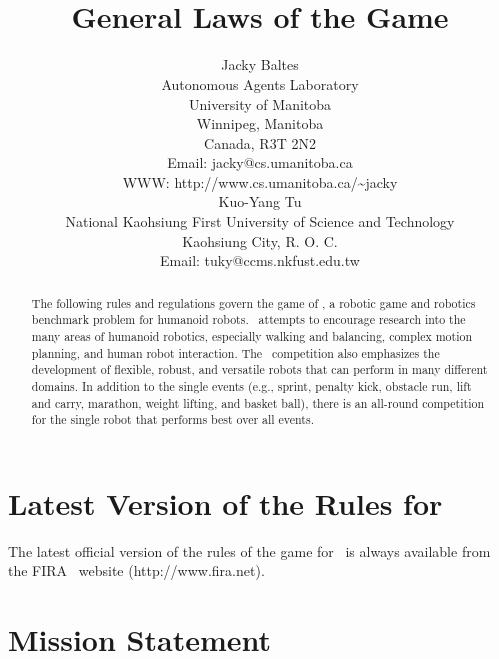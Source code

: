 \documentclass[12pt]{hurocup}
\begin{document}
\title{\HuroCup\\
  General Laws of the Game \thisyear}

\author{Jacky Baltes\\
Autonomous Agents Laboratory\\
University of Manitoba\\
Winnipeg, Manitoba\\
Canada, R3T 2N2\\
Email: jacky@cs.umanitoba.ca\\
WWW: http://www.cs.umanitoba.ca/\~{ }jacky\\[5mm]
Kuo-Yang Tu\\
National Kaohsiung First University of Science and Technology\\
Kaohsiung City, R. O. C.\\
Email: tuky@ccms.nkfust.edu.tw\\
}

\maketitle
\begin{abstract}
The following rules and regulations govern the game of \HuroCup, a
robotic game and robotics benchmark problem for humanoid
robots. 
%
\HuroCup\ attempts to encourage research into the many areas
of humanoid robotics, especially walking and balancing, complex motion
planning, and human robot interaction.
%
The \HuroCup\ competition also emphasizes the development of flexible,
robust, and versatile robots that can perform in many different
domains. 
%
In addition to the single events (e.g., sprint, penalty kick, obstacle
run, lift and carry, marathon, weight lifting, and basket ball), there
is an all-round competition for the single robot that performs best
over all events.
\end{abstract}

\section*{Latest Version of the Rules for \HuroCup}
\label{sec:updates}

The latest official version of the rules of the game for \HuroCup\ is
always available from the FIRA \HuroCup\ website (http://www.fira.net).

\newpage

\section{Mission Statement}
\end{document}
